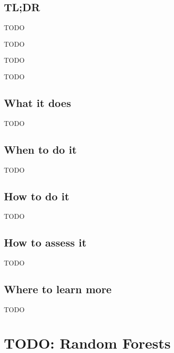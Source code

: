 \documentclass[
]{book}
\providecommand{\tightlist}{%
  \setlength{\itemsep}{0pt}\setlength{\parskip}{0pt}}
\begin{document}
\hypertarget{tldr-15}{%
\section{TL;DR}\label{tldr-15}}

\begin{description}
\tightlist
\item[What it does]
TODO
\item[When to do it]
TODO
\item[How to do it]
TODO
\item[How to assess it]
TODO
\end{description}

\hypertarget{what-it-does-15}{%
\section{What it does}\label{what-it-does-15}}

TODO

\hypertarget{when-to-do-it-15}{%
\section{When to do it}\label{when-to-do-it-15}}

TODO

\hypertarget{how-to-do-it-15}{%
\section{How to do it}\label{how-to-do-it-15}}

TODO

\hypertarget{how-to-assess-it-15}{%
\section{How to assess it}\label{how-to-assess-it-15}}

TODO

\hypertarget{where-to-learn-more-15}{%
\section{Where to learn more}\label{where-to-learn-more-15}}

TODO

\hypertarget{random-forests}{%
\chapter{TODO: Random Forests}\label{random-forests}}
\end{document}
